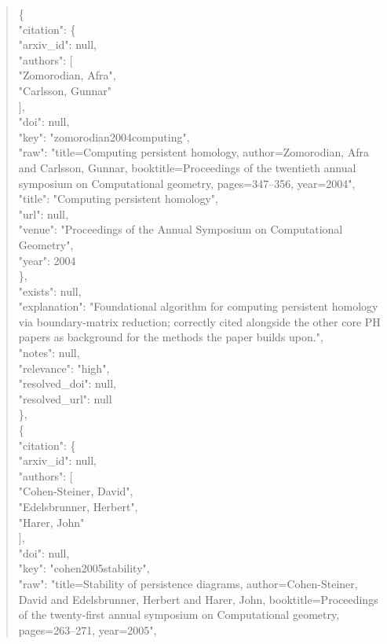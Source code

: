 \documentclass[11pt]{article}
\begin{document}
\begin{quote}
    \{\\
      "citation": \{\\
        "arxiv\_id": null,\\
        "authors": [\\
          "Zomorodian, Afra",\\
          "Carlsson, Gunnar"\\
        ],\\
        "doi": null,\\
        "key": "zomorodian2004computing",\\
        "raw": "title=Computing persistent homology, author=Zomorodian, Afra and Carlsson, Gunnar, booktitle=Proceedings of the twentieth annual symposium on Computational geometry, pages=347--356, year=2004",\\
        "title": "Computing persistent homology",\\
        "url": null,\\
        "venue": "Proceedings of the Annual Symposium on Computational Geometry",\\
        "year": 2004\\
      \},\\
      "exists": null,\\
      "explanation": "Foundational algorithm for computing persistent homology via boundary-matrix reduction; correctly cited alongside the other core PH papers as background for the methods the paper builds upon.",\\
      "notes": null,\\
      "relevance": "high",\\
      "resolved\_doi": null,\\
      "resolved\_url": null\\
    \},\\
    \{\\
      "citation": \{\\
        "arxiv\_id": null,\\
        "authors": [\\
          "Cohen-Steiner, David",\\
          "Edelsbrunner, Herbert",\\
          "Harer, John"\\
        ],\\
        "doi": null,\\
        "key": "cohen2005stability",\\
        "raw": "title=Stability of persistence diagrams, author=Cohen-Steiner, David and Edelsbrunner, Herbert and Harer, John, booktitle=Proceedings of the twenty-first annual symposium on Computational geometry, pages=263--271, year=2005",\\

\end{quote}
\end{document}
